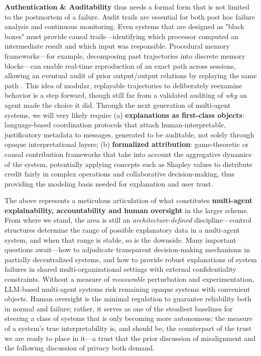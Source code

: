 \documentclass[11pt,a4paper]{article}
\begin{document}
\textbf{Authentication \& Auditability} thus needs a formal form that is not limited to the postmortem of a failure. Audit trails are essential for both post hoc failure analysis and continuous monitoring. Even systems that are designed as "black boxes" must provide causal trails---identifying which processor computed an intermediate result and which input was responsible. Procedural memory frameworks---for example, decomposing past trajectories into discrete memory blocks---can enable real-time reproduction of an exact path across sessions, allowing an eventual audit of prior output/output relations by replaying the same path \cite{arxiv:2510.04851v1}. This idea of modular, replayable trajectories to deliberately reexamine behavior is a step forward, though still far from a validated auditing of \emph{why} an agent made the choice it did. Through the next generation of multi-agent systems, we will very likely require (a) \textbf{explanations as first-class objects}: language-based coordination protocols that attach human-interpretable, justificatory metadata to messages, generated to be auditable, not solely through opaque interpretational layers; (b) \textbf{formalized attribution}: game-theoretic or causal contribution frameworks that take into account the aggregative dynamics of the system, potentially applying concepts such as Shapley values to distribute credit fairly in complex operations and collaborative decision-making, thus providing the modeling basis needed for explanation and user trust.

The above represents a meticulous articulation of what constitutes \textbf{multi-agent explainability, accountability and human oversight} in the larger scheme. From where we stand, the area is still an \emph{architecture-defined} discipline---control structures determine the range of possible explanatory data in a multi-agent system, and when that range is stable, so is the downside. Many important questions await---how to adjudicate transparent decision-making mechanisms in partially decentralized systems, and how to provide robust explanations of system failures in shared multi-organizational settings with external confidentiality constraints. Without a measure of \emph{measurable} perturbation and experimentation, LLM-based multi-agent systems risk remaining opaque systems with convenient objects. Human oversight is the minimal regulation to guarantee reliability both in normal and failure; rather, it serves as one of the steadiest baselines for steering a class of systems that is only becoming more autonomous: the measure of a system's true interpretability is, and should be, the counterpart of the trust we are ready to place in it---a trust that the prior discussion of misalignment and the following discussion of privacy both demand.
\end{document}

